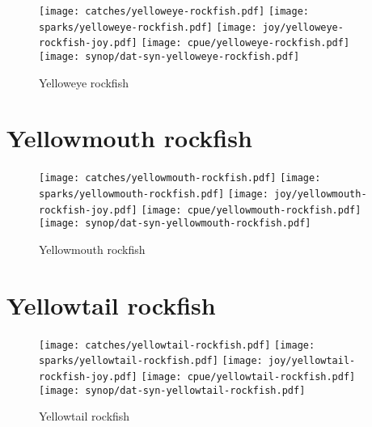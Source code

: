 \begin{figure}[htbp]
\centering
\texttt{[image: catches/yelloweye-rockfish.pdf]}
\texttt{[image: sparks/yelloweye-rockfish.pdf]}
\texttt{[image: joy/yelloweye-rockfish-joy.pdf]}
\texttt{[image: cpue/yelloweye-rockfish.pdf]}
\texttt{[image: synop/dat-syn-yelloweye-rockfish.pdf]}
\caption{Yelloweye rockfish}
\end{figure}
\clearpage
\section*{Yellowmouth rockfish}

\begin{figure}[htbp]
\centering
\texttt{[image: catches/yellowmouth-rockfish.pdf]}
\texttt{[image: sparks/yellowmouth-rockfish.pdf]}
\texttt{[image: joy/yellowmouth-rockfish-joy.pdf]}
\texttt{[image: cpue/yellowmouth-rockfish.pdf]}
\texttt{[image: synop/dat-syn-yellowmouth-rockfish.pdf]}
\caption{Yellowmouth rockfish}
\end{figure}
\clearpage
\section*{Yellowtail rockfish}

\begin{figure}[htbp]
\centering
\texttt{[image: catches/yellowtail-rockfish.pdf]}
\texttt{[image: sparks/yellowtail-rockfish.pdf]}
\texttt{[image: joy/yellowtail-rockfish-joy.pdf]}
\texttt{[image: cpue/yellowtail-rockfish.pdf]}
\texttt{[image: synop/dat-syn-yellowtail-rockfish.pdf]}
\caption{Yellowtail rockfish}
\end{figure}
\clearpage
